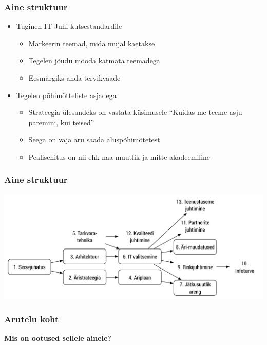 \begin{frame}[fragile]
  \frametitle{Aine struktuur}
	\begin{itemize}
		\item Tuginen IT Juhi kutsestandardile \citep{kutsestandard}
			\begin{itemize}
				\item Markeerin teemad, mida mujal kaetakse
				\item Tegelen jõudu mööda katmata teemadega
				\item Eesmärgiks anda tervikvaade
			\end{itemize}
		\item Tegelen põhimõtteliste asjadega
			\begin{itemize}
				\item Strateegia ülesandeks on vastata küsimusele “Kuidas me teeme asju paremini, kui teised” \citep{de2006strategy}	
				\item Seega on vaja aru saada aluspõhimõtetest
				\item Pealisehitus on nii ehk naa muutlik ja mitte-akadeemiline
			\end{itemize}
	\end{itemize}
\end{frame}

\begin{frame}[fragile]
  \frametitle{Aine struktuur}
		\includegraphics[width=\textwidth]{aine_struktuur.pdf}
\end{frame}

\begin{frame}[fragile]
  \frametitle{Arutelu koht}
		\begin{center}
			\textbf{Mis on ootused sellele ainele?}
		\end{center}
\end{frame}
		
